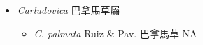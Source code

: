 
  \begin{itemize}
 \item[] \textit{Carludovica} 巴拿馬草屬
                                
  \begin{itemize}
        \item[] \textit{C. palmata} Ruiz \& Pav.  巴拿馬草   NA
  \end{itemize}
  \end{itemize}
